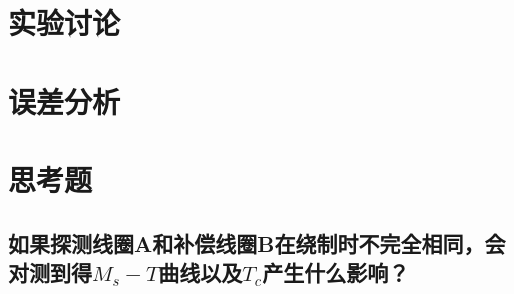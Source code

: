 \documentclass[a4paper]{article}
\begin{document}
\section{实验讨论}

\section{误差分析}

\section{思考题}
\subsection*{如果探测线圈A和补偿线圈B在绕制时不完全相同，会对测到得$M_s - T$曲线以及$T_c$产生什么影响？}

\nocite{jiaocai}

\end{document}
